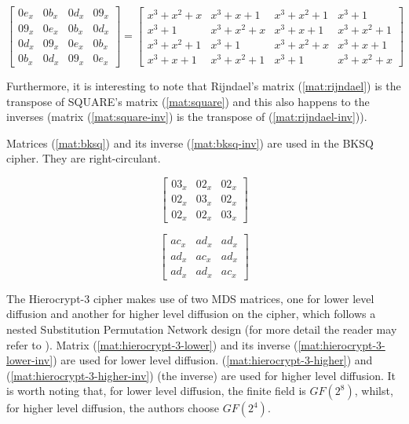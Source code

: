 \begin{equation}\label{mat:rijndael-inv}
\begin{bmatrix}
0e_x & 0b_x & 0d_x & 09_x\\
09_x & 0e_x & 0b_x & 0d_x\\
0d_x & 09_x & 0e_x & 0b_x\\
0b_x & 0d_x & 09_x & 0e_x
\end{bmatrix}
=
\begin{bmatrix}
x^3+x^2+x & x^3+x+1 & x^3+x^2+1 & x^3+1\\
x^3+1 & x^3+x^2+x & x^3+x+1 & x^3+x^2+1\\
x^3+x^2+1 & x^3+1 & x^3+x^2+x & x^3+x+1\\
x^3+x+1 & x^3+x^2+1 & x^3+1 & x^3+x^2+x
\end{bmatrix}
\end{equation}

Furthermore, it is interesting to note that Rijndael's matrix (\ref{mat:rijndael}) is the transpose of SQUARE's matrix (\ref{mat:square}) and this also happens to the inverses (matrix (\ref{mat:square-inv}) is the transpose of (\ref{mat:rijndael-inv})).

Matrices (\ref{mat:bksq}) and its inverse (\ref{mat:bksq-inv}) are used in the BKSQ \cite{BKSQ1998} cipher. They are right-circulant.

\begin{equation}\label{mat:bksq}
\begin{bmatrix}
03_x & 02_x & 02_x\\
02_x & 03_x & 02_x\\
02_x & 02_x & 03_x
\end{bmatrix}
\end{equation}

\begin{equation}\label{mat:bksq-inv}
\begin{bmatrix}
ac_x & ad_x & ad_x\\
ad_x & ac_x & ad_x\\
ad_x & ad_x & ac_x
\end{bmatrix}
\end{equation}

The Hierocrypt-3 cipher makes use of two MDS matrices, one for lower level diffusion and another for higher level diffusion on the cipher, which follows a nested Substitution Permutation Network design (for more detail the reader may refer to \cite{Hierocrypt2000}). Matrix (\ref{mat:hierocrypt-3-lower}) and its inverse (\ref{mat:hierocrypt-3-lower-inv}) are used for lower level diffusion. (\ref{mat:hierocrypt-3-higher}) and (\ref{mat:hierocrypt-3-higher-inv}) (the inverse) are used for higher level diffusion. It is worth noting that, for lower level diffusion, the finite field is $GF(2^8)$, whilst, for higher level diffusion, the authors choose $GF(2^4)$.

